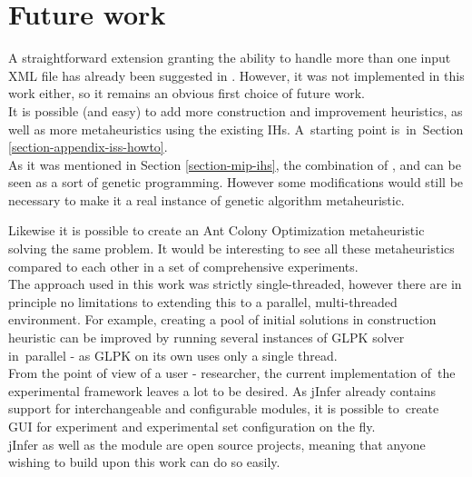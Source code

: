 \chapter{Future work}

A straightforward extension granting the ability to handle more than one input XML file has already been suggested in \cite{fidax}. However, it was not implemented in this work either, so it remains an obvious first choice of future work.\\

It is possible (and easy) to add more construction and improvement heuristics, as well as more metaheuristics using the existing IHs. A~starting point is~in~Section \ref{section-appendix-iss-howto}.\\

As it was mentioned in Section \ref{section-mip-ihs}, the combination of ,  and  can be seen as a sort of genetic programming. However some modifications would still be necessary to make it a real instance of genetic algorithm metaheuristic.

Likewise it is possible to create an Ant Colony Optimization metaheuristic solving the same problem. It would be interesting to see all these metaheuristics compared to each other in a set of comprehensive experiments.\\

The approach used in this work was strictly single-threaded, however there are in principle no limitations to extending this to a parallel, multi-threaded environment. For example, creating a pool of initial solutions in  construction heuristic can be improved by running several instances of GLPK solver in~parallel - as GLPK on its own uses only a single thread.\\

From the point of view of a user - researcher, the current implementation of~the experimental framework leaves a lot to be desired. As jInfer already contains support for interchangeable and configurable modules, it is possible to~create GUI for experiment and experimental set configuration on the fly.\\

jInfer as well as the  module are open source projects, meaning that anyone wishing to build upon this work can do so easily.

